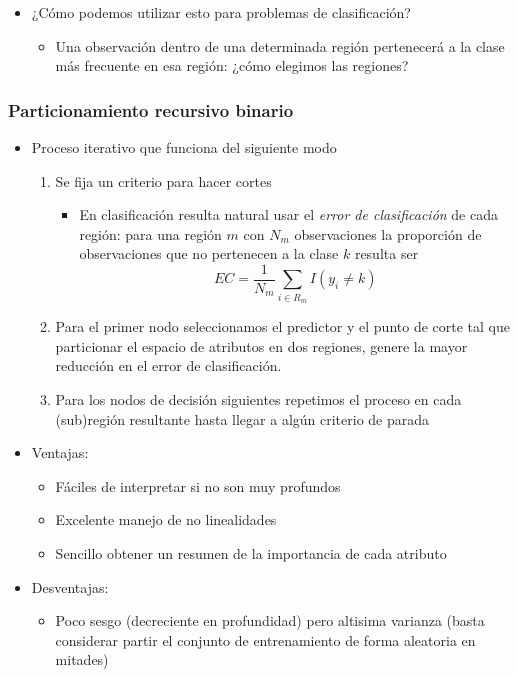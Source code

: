 \documentclass[leqno, 10pt, envcountsect]{beamer}
\numberwithin{equation}{section}
\theoremstyle{definition}
\theoremstyle{example}
\numberwithin{figure}{section}
\numberwithin{table}{section}
\let\olditem\item
\renewcommand{\item}{%
\olditem\vspace{1pt}}
\begin{document}
\begin{frame}[fragile=singleslide]
\begin{itemize}
\begin{itemize}
\begin{center}
          \end{center}
      \end{itemize}
    \item ¿Cómo podemos utilizar esto para problemas de clasificación?
      \begin{itemize}
        \item Una observación dentro de una determinada región pertenecerá a la
          clase más frecuente en esa región: ¿cómo elegimos las regiones?
      \end{itemize}
  \end{itemize}
\end{frame}
\begin{frame}[fragile=singleslide]
  \frametitle{Particionamiento recursivo binario}
  \begin{itemize}
    \item Proceso iterativo que funciona del siguiente modo
      \begin{enumerate}
        \item Se fija un criterio para hacer cortes
          \begin{itemize}
            \item En clasificación resulta natural
usar el \textit{error de clasificación} de cada región: para una región $m$ con $N_{m}$ observaciones la proporción de observaciones
que no pertenecen a la clase $k$ resulta ser
\begin{equation*}
  EC = \frac{1}{N_{m}}\sum_{i\in R_{m}}I(y_{i} \not = k)
\end{equation*}
          \end{itemize}
      \item Para el primer nodo seleccionamos el predictor y el punto de corte
        tal que particionar el espacio de atributos en dos regiones, genere la
          mayor reducción en el error de clasificación.
      \item Para los nodos de decisión
siguientes repetimos el proceso en cada (sub)región resultante hasta llegar a algún criterio de parada
      \end{enumerate}
  \item Ventajas:
    \begin{itemize}
      \item Fáciles de interpretar si no son muy profundos
      \item Excelente manejo de no linealidades
      \item Sencillo obtener un resumen de la importancia de cada atributo
    \end{itemize}
  \item Desventajas:
    \begin{itemize}
      \item  Poco sesgo (decreciente en profundidad) pero altisima varianza (basta considerar partir el
        conjunto de entrenamiento de forma aleatoria en mitades)
    \end{itemize}
  \end{itemize}
\end{frame}
\end{document}
